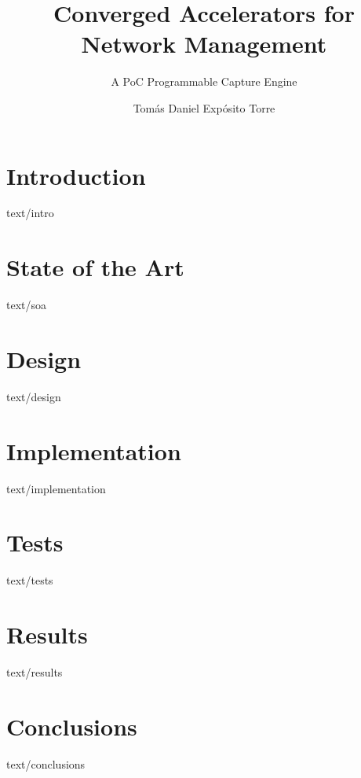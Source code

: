\documentclass[epsbased,tfg,final,gray]{tfgtfmthesisuam}
\title{Converged Accelerators for Network Management}
\subtitle{A PoC Programmable Capture Engine}
\author{Tomás Daniel Expósito Torre}
\begin{document}
\chapter{Introduction}{text/intro}
\chapter{State of the Art}{text/soa}
\chapter{Design}{text/design}
\chapter{Implementation}{text/implementation}
\chapter{Tests}{text/tests}
\chapter{Results}{text/results}
\chapter{Conclusions}{text/conclusions}
\end{document}
